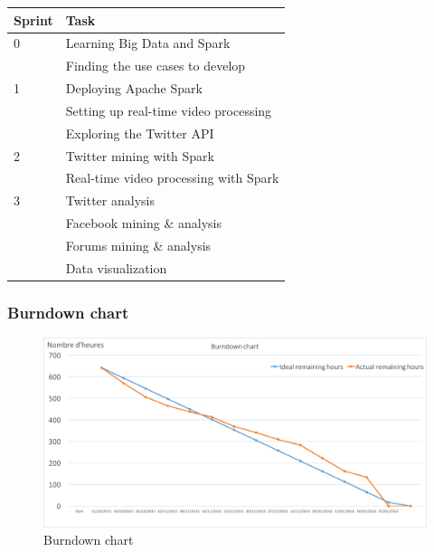 \documentclass[11pt]{article}
\begin{document}
\begin{center}
\begin{tabular}{|l|l|}
  \hline
  Sprint & Task\\
  \hline
  0 & Learning Big Data and Spark \\
    & Finding the use cases to develop \\ \hline
  1 & Deploying Apache Spark \\
    & Setting up real-time video processing \\
    & Exploring the Twitter API \\ \hline
  2 & Twitter mining with Spark \\
    & Real-time video processing with Spark \\ \hline
  3 & Twitter analysis \\
    & Facebook mining \& analysis \\
    & Forums mining \& analysis \\
    & Data visualization \\
  \hline
\end{tabular}
\end{center}

\subsubsection{Burndown chart}

\begin{figure}[h!]
    \centering
    \includegraphics[scale=0.5]{img/burndown.png}
    \caption{Burndown chart}
    \label{burndown}
\end{figure}
\end{document}
